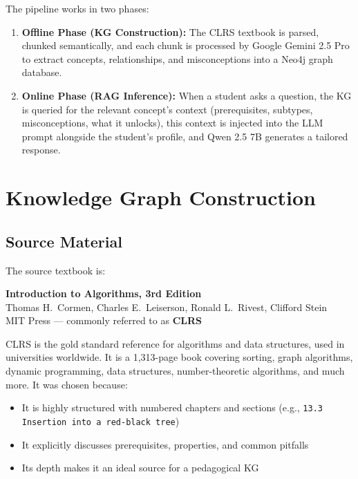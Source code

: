 \documentclass[12pt,a4paper]{article}
\begin{document}
The pipeline works in two phases:

\begin{enumerate}
  \item \textbf{Offline Phase (KG Construction):} The CLRS textbook is parsed,
    chunked semantically, and each chunk is processed by Google Gemini 2.5 Pro
    to extract concepts, relationships, and misconceptions into a Neo4j graph
    database.

  \item \textbf{Online Phase (RAG Inference):} When a student asks a question,
    the KG is queried for the relevant concept's context (prerequisites,
    subtypes, misconceptions, what it unlocks), this context is injected into
    the LLM prompt alongside the student's profile, and Qwen 2.5 7B generates a
    tailored response.
\end{enumerate}

\section{Knowledge Graph Construction}

\subsection{Source Material}

The source textbook is:

\begin{tcolorbox}[colback=lightgray, colframe=bordergray, arc=3pt,
  left=10pt, right=10pt, top=6pt, bottom=6pt]
  \textbf{Introduction to Algorithms, 3rd Edition}\\
  Thomas H.\ Cormen, Charles E.\ Leiserson, Ronald L.\ Rivest, Clifford Stein\\
  MIT Press --- commonly referred to as \textbf{CLRS}
\end{tcolorbox}

CLRS is the gold standard reference for algorithms and data structures, used in
universities worldwide. It is a 1,313-page book covering sorting, graph
algorithms, dynamic programming, data structures, number-theoretic algorithms,
and much more. It was chosen because:

\begin{itemize}
  \item It is highly structured with numbered chapters and sections
    (e.g., \texttt{13.3 Insertion into a red-black tree})
  \item It explicitly discusses prerequisites, properties, and common pitfalls
  \item Its depth makes it an ideal source for a pedagogical KG
\end{itemize}
\end{document}
